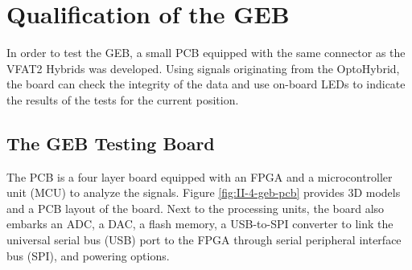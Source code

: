   \section{Qualification of the GEB}

    In order to test the GEB, a small PCB equipped with the same connector as the VFAT2 Hybrids was developed. Using signals originating from the OptoHybrid, the board can check the integrity of the data and use on-board LEDs to indicate the results of the tests for the current position.

    \subsection{The GEB Testing Board}

      The PCB is a four layer board equipped with an FPGA and a microcontroller unit (MCU) to analyze the signals. Figure \ref{fig:II-4-geb-pcb} provides 3D models and a PCB layout of the board. Next to the processing units, the board also embarks an ADC, a DAC, a flash memory, a USB-to-SPI converter to link the universal serial bus (USB) port to the FPGA through serial peripheral interface bus (SPI), and powering options.

